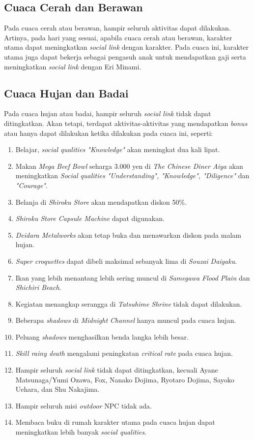 \subsection{Cuaca Cerah dan Berawan}
Pada cuaca cerah atau berawan, hampir seluruh aktivitas dapat dilakukan. Artinya, pada hari yang sesuai, apabila cuaca cerah atau berawan, karakter utama dapat meningkatkan \textit{social link} dengan karakter. Pada cuaca ini, karakter utama juga dapat bekerja sebagai pengasuh anak untuk mendapatkan gaji serta meningkatkan \textit{social link} dengan Eri Minami.

\subsection{Cuaca Hujan dan Badai}
Pada cuaca hujan atau badai, hampir seluruh \textit{social link} tidak dapat ditingkatkan. Akan tetapi, terdapat aktivitas-aktivitas yang mendapatkan \textit{bonus} atau hanya dapat dilakukan ketika dilakukan pada cuaca ini, seperti:
\begin{enumerate}
    \item Belajar, \textit{social qualities "Knowledge"} akan meningkat dua kali lipat.
    \item Makan \textit{Mega Beef Bowl} seharga 3.000 yen di \textit{The Chinese Diner Aiya} akan meningkatkan \textit{Social qualities "Understanding", "Knowledge", "Diligence"} dan \textit{"Courage"}.
    \item Belanja di \textit{Shiroku Store} akan mendapatkan diskon 50\%.
    \item \textit{Shiroku Store Capsule Machine} dapat digunakan.
    \item \textit{Deidara Metalworks} akan tetap buka dan menawarkan diskon pada malam hujan.
    \item \textit{Super croquettes} dapat dibeli maksimal sebanyak lima di \textit{Souzai Daigaku}.
    \item Ikan yang lebih menantang lebih sering muncul di \textit{Samegawa Flood Plain} dan \textit{Shichiri Beach}.
    \item Kegiatan menangkap serangga di \textit{Tatsuhime Shrine} tidak dapat dilakukan.
    \item Beberapa \textit{shadows} di \textit{Midnight Channel} hanya muncul pada cuaca hujan.
    \item Peluang \textit{shadows} menghasilkan benda langka lebih besar.
    \item \textit{Skill rainy death} mengalami peningkatan \textit{critical rate} pada cuaca hujan.
    \item Hampir seluruh \textit{social link} tidak dapat ditingkatkan, kecuali Ayane Matsunaga/Yumi Ozawa, Fox, Nanako Dojima, Ryotaro Dojima, Sayoko Uehara, dan Shu Nakajima.
    \item Hampir seluruh misi \textit{outdoor} NPC tidak ada.
    \item Membaca buku di rumah karakter utama pada cuaca hujan dapat meningkatkan lebih banyak \textit{social qualities}.
\end{enumerate}


